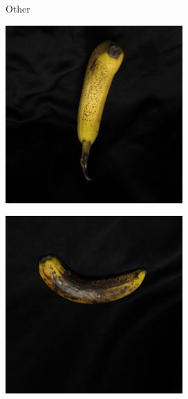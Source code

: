 \documentclass{article} %
\begin{document}
\begin{figure}[h]
\begin{subfigure}{.123\textwidth}
\captionsetup{labelformat=empty}
\caption{Other}
\end{subfigure}%
\qquad
 \begin{subfigure}{.123\textwidth}
  \centering
\includegraphics[width=\textwidth]{../results/q_samples/mis_other/RIPE_3_OTHER_2.jpg}
\captionsetup{labelformat=empty}
\caption{}
\end{subfigure}%
  \begin{subfigure}{.123\textwidth}
  \centering
\includegraphics[width=\textwidth]{../results/q_samples/mis_other/ROTTEN_3_OTHER6.jpg}

\end{subfigure}
\end{figure}
\end{document}
